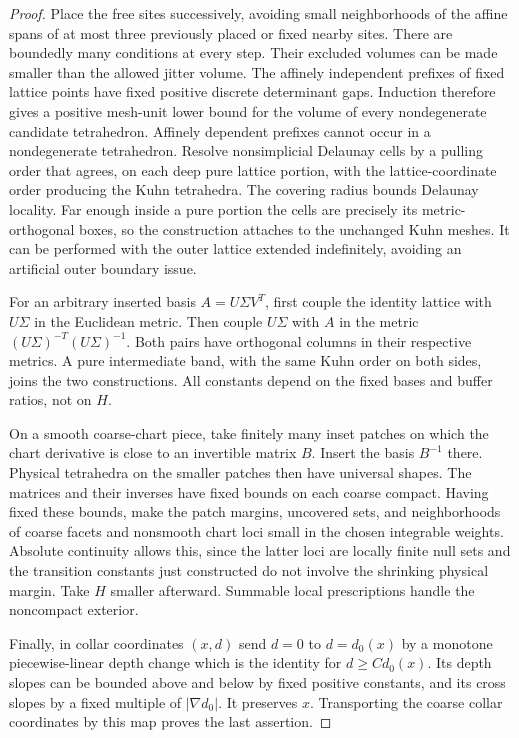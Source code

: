 \documentclass[11pt]{article}
\numberwithin{equation}{section}
\theoremstyle{definition}
\theoremstyle{remark}
\begin{document}
\begin{proof}
Place the free sites successively, avoiding small neighborhoods of the
affine spans of at most three previously placed or fixed nearby sites.
There are boundedly many conditions at every step.  Their excluded
volumes can be made smaller than the allowed jitter volume.  The
affinely independent prefixes of fixed lattice points have fixed
positive discrete determinant gaps.  Induction therefore gives a
positive mesh-unit lower bound for the volume of every nondegenerate
candidate tetrahedron.  Affinely dependent prefixes cannot occur in a
nondegenerate tetrahedron.  Resolve nonsimplicial Delaunay cells by a
pulling order that agrees, on each deep pure lattice portion, with the
lattice-coordinate order producing the Kuhn tetrahedra.  The covering
radius bounds Delaunay locality.  Far enough inside a pure portion the
cells are precisely its metric-orthogonal boxes, so the construction
attaches to the unchanged Kuhn meshes.  It can be performed with the
outer lattice extended indefinitely, avoiding an artificial outer
boundary issue.

For an arbitrary inserted basis $A=U\Sigma V^T$, first couple the
identity lattice with $U\Sigma$ in the Euclidean metric.  Then couple
$U\Sigma$ with $A$ in the metric
$(U\Sigma)^{-T}(U\Sigma)^{-1}$.  Both pairs have orthogonal columns in
their respective metrics.  A pure intermediate band, with the same
Kuhn order on both sides, joins the two constructions.  All constants
depend on the fixed bases and buffer ratios, not on $H$.

On a smooth coarse-chart piece, take finitely many inset patches on
which the chart derivative is close to an invertible matrix $B$.
Insert the basis $B^{-1}$ there.  Physical tetrahedra on the smaller
patches then have universal shapes.  The matrices and their inverses
have fixed bounds on each coarse compact.  Having fixed these bounds,
make the patch margins, uncovered sets, and neighborhoods of coarse
facets and nonsmooth chart loci small in the chosen integrable
weights.  Absolute continuity allows this, since the latter loci are
locally finite null sets and the transition constants just constructed
do not involve the shrinking physical margin.  Take $H$ smaller
afterward.  Summable local prescriptions handle the noncompact
exterior.

Finally, in collar coordinates $(x,d)$ send $d=0$ to $d=d_0(x)$ by a
monotone piecewise-linear depth change which is the identity for
$d\ge C d_0(x)$.  Its depth slopes can be bounded above and below by
fixed positive constants, and its cross slopes by a fixed multiple of
$|\nabla d_0|$.  It preserves $x$.  Transporting the coarse collar
coordinates by this map proves the last assertion.
\end{proof}
\end{document}
